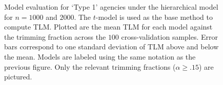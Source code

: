 \documentclass[12pt]{article}
\begin{document}
\begin{figure}
\quad
{}
\caption{Model evaluation for `Type 1' agencies under the hierarchical model for $n=1000$ and $2000$. The $t$-model is used as the base method to compute TLM. Plotted are the mean TLM for each model against the trimming fraction across the $100$ cross-validation samples. Error bars correspond to one standard deviation of TLM above and below the mean. Models are labeled using the same notation as the previous figure. Only the relevant trimming fractions ($\alpha\geq .15$) are pictured.  
}
\label{fig:hierType1Marg}
\end{figure}
\end{document}
